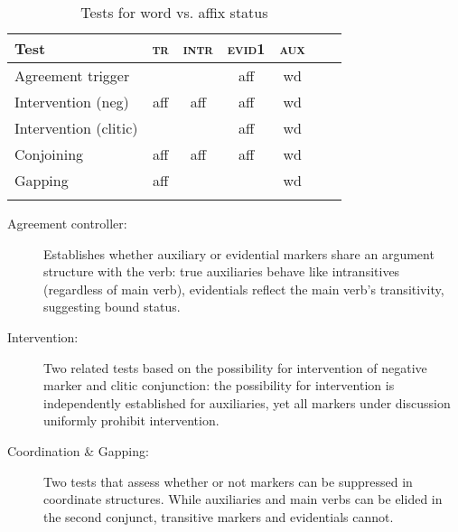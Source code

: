 \documentclass[output=paper]{langsci/langscibook}
\begin{document}
\begin{table}[htbp]
  \centering
  \begin{tabular}{lcccccc}
    \lsptoprule
    Test & \textsc{tr} & \textsc{intr} & \textsc{evid1} &
                                                        \textsc{aux}\\
    \midrule
    Agreement trigger & & & aff
                                       & wd \\
    Intervention (neg) & aff & aff & aff
                                                        & wd\\
    Intervention (clitic) & & & aff
                                       & wd\\
    Conjoining & aff & aff & aff
                                                        & wd\\
    Gapping & aff &&
                       & wd\\
    \lspbottomrule
  \end{tabular}
  \caption{Tests for word vs. affix status \citep{Harris09}}
  \label{tab:Wordhood}
\end{table}

\begin{description}
\item[Agreement controller:] Establishes whether
  auxiliary or evidential markers share an argument structure with the
  verb: true auxiliaries behave like intransitives (regardless of main
  verb), evidentials reflect the main verb's transitivity, suggesting
  bound status.
\item[Intervention:] Two related tests based on the possibility for
  intervention of negative marker and clitic conjunction:
  the possibility for intervention is independently established for
  auxiliaries, yet all markers under discussion uniformly prohibit
  intervention. 
\item[Coordination \& Gapping:] {\sloppy Two tests that assess
  whether or not markers can be suppressed in coordinate structures. While
  auxiliaries and main verbs can be elided in the second conjunct,
  transitive markers and evidentials cannot. }
\end{description}
\end{document}
